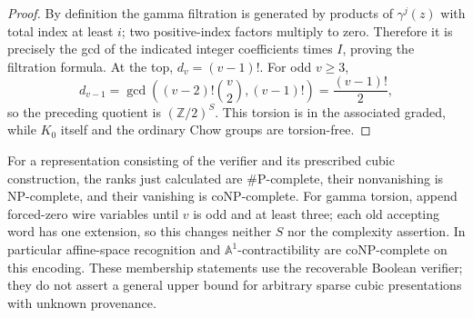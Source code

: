 \begin{proof}
By definition the gamma filtration is generated by products of $\gamma^{j}(z)$ with total index at least $i$; two positive-index factors multiply to zero. Therefore it is precisely the gcd of the indicated integer coefficients times $I$, proving the filtration formula. At the top, $d_v=(v-1)!$. For odd $v\geq3$,
\[
 d_{v-1}=\gcd\left((v-2)!\binom v2,(v-1)!\right)
          =\frac{(v-1)!}{2},
\]
so the preceding quotient is $(\mathbb Z/2)^S$. This torsion is in the associated graded, while $K_0$ itself and the ordinary Chow groups are torsion-free.
\end{proof}

For a representation consisting of the verifier and its prescribed cubic construction, the ranks just calculated are $\#\mathrm P$-complete, their nonvanishing is NP-complete, and their vanishing is coNP-complete. For gamma torsion, append forced-zero wire variables until $v$ is odd and at least three; each old accepting word has one extension, so this changes neither $S$ nor the complexity assertion. In particular affine-space recognition and $\mathbb A^1$-contractibility are coNP-complete on this encoding. These membership statements use the recoverable Boolean verifier; they do not assert a general upper bound for arbitrary sparse cubic presentations with unknown provenance.


